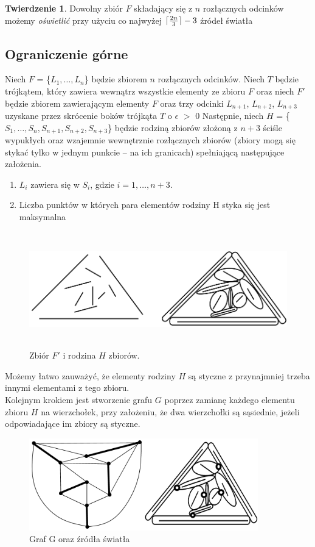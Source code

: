 \documentclass[brudnopis]{xmgr}
\DeclarePairedDelimiter\ceil{\lceil}{\rceil}
\theoremstyle{definition}
\newtheorem{Twierdzenie}{Twierdzenie}
\begin{document}
\begin{Twierdzenie} \cite{illumination}
 Dowolny zbiór $F$ składający się z $n$ rozłącznych odcinków możemy \emph{oświetlić} przy użyciu co najwyżej $\ceil{\frac{2n}{3}} - 3$ źródeł światła
\end{Twierdzenie}

\subsection{Ograniczenie górne}
\indent Niech $F$ = \{$L_1, \ldots, L_n$\} będzie zbiorem $n$ rozłącznych odcinków. Niech $T$ będzie trójkątem, który zawiera wewnątrz wszystkie elementy ze zbioru $F$ oraz niech $F'$ będzie zbiorem zawierającym elementy $F$ oraz trzy odcinki $L_{n+1}$, $L_{n+2}$, $L_{n+3}$ uzyskane przez skrócenie boków trójkąta $T$ o $\epsilon$ $>$ 0
Następnie, niech $H$ = \{$S_1,\ldots,S_n,S_{n+1},S_{n+2},S_{n+3}$\} będzie rodziną zbiorów złożoną z $n + 3$ ściśle wypukłych oraz wzajemnie wewnętrznie rozłącznych zbiorów (zbiory mogą się stykać tylko w jednym punkcie -- na ich granicach) spełniającą następujące założenia.
\begin{enumerate}
  \item $L_i$ zawiera się w $S_i$, gdzie $i = 1,\ldots,n+3$.
  \item Liczba punktów w których para elementów rodziny H styka się jest maksymalna
\end{enumerate}
\begin{figure}[ht!]
 \centering
  \includegraphics[height=5cm, width=13.5cm]{rysunki/podswietlenie.png}
  \caption{Zbiór $F'$ i rodzina $H$ zbiorów.}
\end{figure} 
Możemy łatwo zauważyć, że elementy rodziny $H$ są styczne z przynajmniej trzeba innymi elementami z tego zbioru. 
\\\indent Kolejnym krokiem jest stworzenie grafu $G$ poprzez zamianę każdego elementu zbioru $H$ na wierzchołek, przy założeniu, że dwa wierzchołki są sąsiednie, jeżeli odpowiadające im zbiory są styczne.
\begin{figure}[ht!]
 \centering
  \includegraphics[height=4cm]{rysunki/skojarzenia_zrodla_swiatla.png}
  \caption{Graf G oraz źródła światła}
\end{figure}
\end{document}
